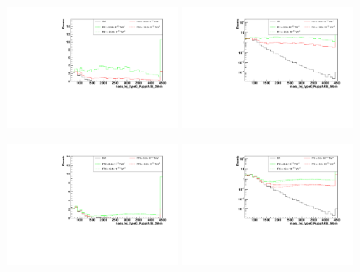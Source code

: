 \begin{figure}[h]
  \begin{center}
	\includegraphics[width=0.45\textwidth]{Plots/aQGC_kinematics/mass_lvj_type0_PuppiAK8_39bin_FS1.pdf}%
	\includegraphics[width=0.45\textwidth]{Plots/aQGC_kinematics/mass_lvj_type0_PuppiAK8_39bin_FS1_log.pdf}\\	
    \caption{}
  \end{center}
\end{figure}
\begin{figure}[h]
  \begin{center}
	\includegraphics[width=0.45\textwidth]{Plots/aQGC_kinematics/mass_lvj_type0_PuppiAK8_39bin_FT0.pdf}%
	\includegraphics[width=0.45\textwidth]{Plots/aQGC_kinematics/mass_lvj_type0_PuppiAK8_39bin_FT0_log.pdf}\\	
    \caption{}
  \end{center}
\end{figure}
